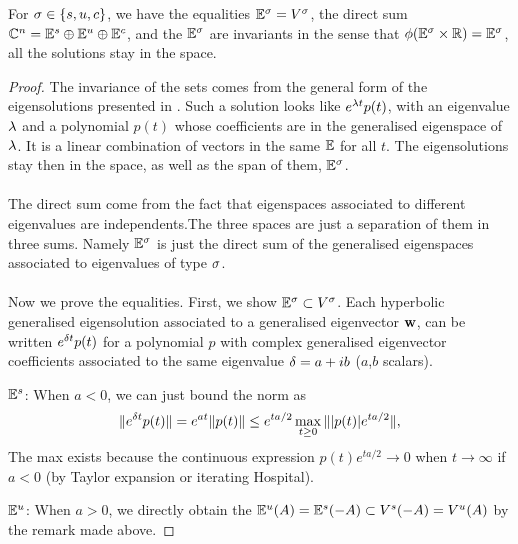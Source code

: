 \begin{lemme}
    For $\sigma\in\{s,u,c\}$, we have the equalities $\mathbb{E}^\sigma=V^\sigma$, the direct sum $\mathbb{C}^n = \mathbb{E}^s\oplus\mathbb{E}^u\oplus\mathbb{E}^c$, and the $\mathbb{E}^\sigma$ are invariants in the sense that $\phi(\mathbb{E}^\sigma\times\mathbb{R})=\mathbb{E}^\sigma$, \ie all the solutions stay in the space.
\end{lemme}
\begin{proof}
The invariance of the sets comes from the general form of the eigensolutions presented in . Such a solution looks like $e^{\lambda t}p(t)$, with an eigenvalue $\lambda$ and a polynomial $p(t)$ whose coefficients are in the generalised eigenspace of $\lambda$. It is a linear combination of vectors in the same $\mathbb{E}$ for all $t$. The eigensolutions stay then in the space, as well as the span of them, $\mathbb{E}^\sigma$.
\\ \\
The direct sum come from the fact that eigenspaces associated to different eigenvalues are independents.The three spaces are just a separation of them in three sums. Namely $\mathbb{E}^\sigma$ is just the direct sum of the generalised eigenspaces associated to eigenvalues of type $\sigma$.
\\ \\
Now we prove the equalities. First, we show $\mathbb{E}^\sigma\subset V^\sigma$. Each hyperbolic generalised eigensolution associated to a generalised eigenvector $\mathbf{w}$, can be written $e^{\delta t}p(t)$ for a  polynomial $p$ with complex generalised eigenvector coefficients associated to the same eigenvalue $\delta=a+ib$ ($a$,$b$ scalars).

$\mathbb{E}^s$: When $a<0$, we can just bound the norm as 
$$\|e^{\delta t}p(t)\|=e^{at}\|p(t)\| \leq e^{ta/2} \max_{t\geq0}\||p(t)|e^{ta/2}\| ,$$
The max exists because the continuous expression $p(t)e^{ta/2}\to 0$ when $t\to\infty$ if $a<0$ (by Taylor expansion or iterating Hospital).

$\mathbb{E}^u$: When $a>0$, we directly obtain the $\mathbb{E}^u(A) = \mathbb{E}^s(-A) \subset V^s(-A) = V^u(A)$ by the remark made above.


\end{proof}
